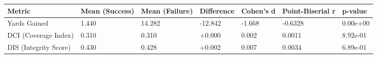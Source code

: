 \begin{tabular}{lllllll}
\toprule
Metric & Mean (Success) & Mean (Failure) & Difference & Cohen's d & Point-Biserial r & p-value \\
\midrule
Yards Gained & 1.440 & 14.282 & -12.842 & -1.668 & -0.6328 & 0.00e+00 \\
DCI (Coverage Index) & 0.310 & 0.310 & +0.000 & 0.002 & 0.0011 & 8.92e-01 \\
DIS (Integrity Score) & 0.430 & 0.428 & +0.002 & 0.007 & 0.0034 & 6.89e-01 \\
\bottomrule
\end{tabular}

